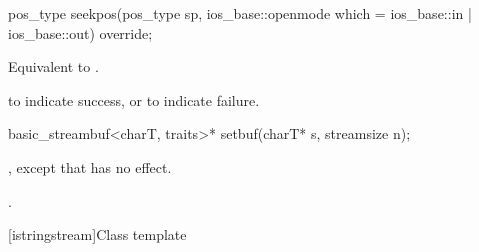 %
\begin{itemdecl}
pos_type seekpos(pos_type sp,
                 ios_base::openmode which
                   = ios_base::in | ios_base::out) override;
\end{itemdecl}

\begin{itemdescr}
\pnum
\effects
Equivalent to .

\pnum
\returns
{}
to indicate success, or
to indicate failure.
\end{itemdescr}

%
\begin{itemdecl}
basic_streambuf<charT, traits>* setbuf(charT* s, streamsize n);
\end{itemdecl}

\begin{itemdescr}
\pnum
\effects
{},
except that
has no effect.

\pnum
\returns
{}.
\end{itemdescr}

[istringstream]{Class template }

